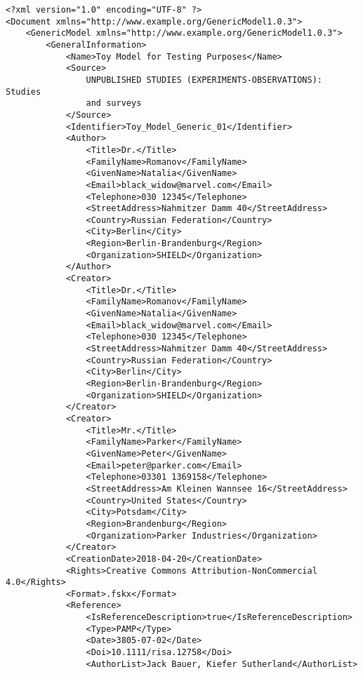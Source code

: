 \documentclass[a4paper]{report}
\begin{document}
\begin{lstlisting}[language=RAKIP, caption={Example of StudySample}]
<?xml version="1.0" encoding="UTF-8" ?>
<Document xmlns="http://www.example.org/GenericModel1.0.3">
    <GenericModel xmlns="http://www.example.org/GenericModel1.0.3">
        <GeneralInformation>
            <Name>Toy Model for Testing Purposes</Name>
            <Source>
                UNPUBLISHED STUDIES (EXPERIMENTS-OBSERVATIONS): Studies
                and surveys
            </Source>
            <Identifier>Toy_Model_Generic_01</Identifier>
            <Author>
                <Title>Dr.</Title>
                <FamilyName>Romanov</FamilyName>
                <GivenName>Natalia</GivenName>
                <Email>black_widow@marvel.com</Email>
                <Telephone>030 12345</Telephone>
                <StreetAddress>Nahmitzer Damm 40</StreetAddress>
                <Country>Russian Federation</Country>
                <City>Berlin</City>
                <Region>Berlin-Brandenburg</Region>
                <Organization>SHIELD</Organization>
            </Author>
            <Creator>
                <Title>Dr.</Title>
                <FamilyName>Romanov</FamilyName>
                <GivenName>Natalia</GivenName>
                <Email>black_widow@marvel.com</Email>
                <Telephone>030 12345</Telephone>
                <StreetAddress>Nahmitzer Damm 40</StreetAddress>
                <Country>Russian Federation</Country>
                <City>Berlin</City>
                <Region>Berlin-Brandenburg</Region>
                <Organization>SHIELD</Organization>
            </Creator>
            <Creator>
                <Title>Mr.</Title>
                <FamilyName>Parker</FamilyName>
                <GivenName>Peter</GivenName>
                <Email>peter@parker.com</Email>
                <Telephone>03301 1369158</Telephone>
                <StreetAddress>Am Kleinen Wannsee 16</StreetAddress>
                <Country>United States</Country>
                <City>Potsdam</City>
                <Region>Brandenburg</Region>
                <Organization>Parker Industries</Organization>
            </Creator>
            <CreationDate>2018-04-20</CreationDate>
            <Rights>Creative Commons Attribution-NonCommercial 4.0</Rights>
            <Format>.fskx</Format>
            <Reference>
                <IsReferenceDescription>true</IsReferenceDescription>
                <Type>PAMP</Type>
                <Date>3805-07-02</Date>
                <Doi>10.1111/risa.12758</Doi>
                <AuthorList>Jack Bauer, Kiefer Sutherland</AuthorList>

\end{lstlisting}
\end{document}
